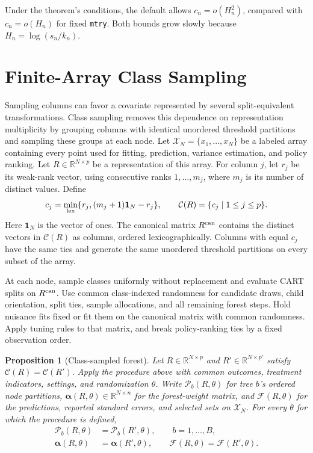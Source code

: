 \documentclass[12pt]{article}
\newtheorem{proposition}{Proposition}
\newcommand{\R}{\mathbb R}
\begin{document}
Under the theorem's conditions, the default allows \(c_n=o(H_n^2)\), compared with \(c_n=o(H_n)\) for fixed \texttt{mtry}. Both bounds grow slowly because \(H_n=\log(s_n/k_n)\).

\section{Finite-Array Class Sampling}\label{sec:quotient}

Sampling columns can favor a covariate represented by several split-equivalent transformations. Class sampling removes this dependence on representation multiplicity by grouping columns with identical unordered threshold partitions and sampling these groups at each node. Let \(\mathcal X_N=\{x_1,\ldots,x_N\}\) be a labeled array containing every point used for fitting, prediction, variance estimation, and policy ranking. Let \(R\in\R^{N\times p}\) be a representation of this array. For column \(j\), let \(r_j\) be its weak-rank vector, using consecutive ranks \(1,\ldots,m_j\), where \(m_j\) is its number of distinct values. Define
\[
c_j=\min_{\rm lex}\{r_j,(m_j+1)\mathbf 1_N-r_j\},
\qquad
\mathcal C(R)=\{c_j\mid1\le j\le p\}.
\]
Here \(\mathbf 1_N\) is the vector of ones. The canonical matrix \(R^{\rm can}\) contains the distinct vectors in \(\mathcal C(R)\) as columns, ordered lexicographically. Columns with equal \(c_j\) have the same ties and generate the same unordered threshold partitions on every subset of the array.

At each node, sample classes uniformly without replacement and evaluate CART splits on \(R^{\rm can}\). Use common class-indexed randomness for candidate draws, child orientation, split ties, sample allocations, and all remaining forest steps. Hold nuisance fits fixed or fit them on the canonical matrix with common randomness. Apply tuning rules to that matrix, and break policy-ranking ties by a fixed observation order.

\begin{proposition}[Class-sampled forest]\label{prop:class}
Let \(R\in\R^{N\times p}\) and \(R'\in\R^{N\times p'}\) satisfy \(\mathcal C(R)=\mathcal C(R')\). Apply the procedure above with common outcomes, treatment indicators, settings, and randomization \(\theta\). Write \(\mathcal P_b(R,\theta)\) for tree \(b\)'s ordered node partitions, \(\boldsymbol\alpha(R,\theta)\in\R^{N\times n}\) for the forest-weight matrix, and \(\mathcal F(R,\theta)\) for the predictions, reported standard errors, and selected sets on \(\mathcal X_N\). For every \(\theta\) for which the procedure is defined,
\[
\begin{aligned}
\mathcal P_b(R,\theta)&=\mathcal P_b(R',\theta),\qquad b=1,\ldots,B,\\
\boldsymbol\alpha(R,\theta)&=\boldsymbol\alpha(R',\theta),\qquad
\mathcal F(R,\theta)=\mathcal F(R',\theta).
\end{aligned}
\]
\end{proposition}
\end{document}

